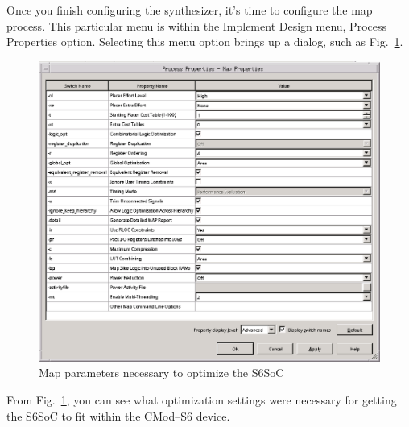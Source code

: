 \documentclass{gqtekspec}
\begin{document}
Once you finish configuring the synthesizer, it's time to configure the map
process.  This particular menu is within the Implement Design menu, Process
Properties option.  Selecting this menu option brings up a dialog, such as
Fig.~\ref{fig:mapopts}.
\begin{figure}
\begin{center}
\includegraphics[width=6in]{../gfx/mapopts.eps}
\caption{Map parameters necessary to optimize the S6SoC}\label{fig:mapopts}
\end{center}\end{figure}
From Fig.~\ref{fig:mapopts}, you can see what optimization settings were
necessary for getting the S6SoC to fit within the CMod--S6 device.
\end{document}
